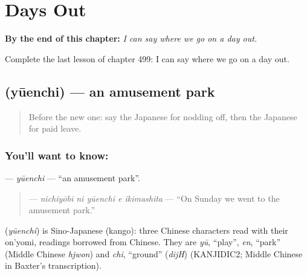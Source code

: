 
\chapter{Days Out}
\label{ch:ja-days-out}

\begin{chapteropening}
\textbf{By the end of this chapter:} \emph{I can say where we go on a day out.}

Complete the last lesson of chapter 499: I can say where we go on a day out.
\end{chapteropening}

\section[\texorpdfstring{\ja{ゆうえんち} (yūenchi)}{ゆうえんち (yūenchi)}]{ (yūenchi) — an amusement park}

\label{lesson:JA-C499-yuuenchi}



\begin{quote}
Before the new one: say the Japanese for nodding off, then the Japanese for paid leave.
\end{quote}

\subsection*{You'll want to know: }
\textbf{} — \emph{yūenchi} — \textquotedblleft{}an amusement park\textquotedblright{}.

\begin{quote}
\textbf{  } — \emph{nichiyōbi ni yūenchi e ikimashita} — \textquotedblleft{}On Sunday we went to the amusement park.\textquotedblright{}
\end{quote}

\begin{cousinweb}
\textbf{} (\emph{yūenchi}) is Sino-Japanese (kango): three Chinese characters read with their on'yomi, readings borrowed from Chinese. They are \emph{yū}, \textquotedblleft{}play\textquotedblright{}, \emph{en}, \textquotedblleft{}park\textquotedblright{} (Middle Chinese \emph{hjwon}) and \emph{chi}, \textquotedblleft{}ground\textquotedblright{} (\emph{dijH}) (KANJIDIC2; Middle Chinese in Baxter's transcription).
\end{cousinweb}

